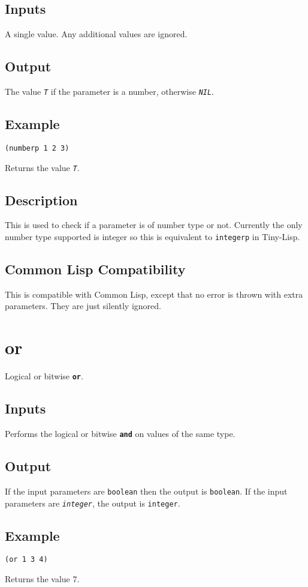 \documentclass[10pt, openany]{book}
\newcommand{\operation}[1]{\textbf{\texttt{#1}}}
\newcommand{\constant}[1]{\emph{\texttt{#1}}}
\newcommand{\keyword}[1]{\texttt{#1}}
\newcommand{\datatype}[1]{\texttt{#1}}
\newcommand{\tl}{Tiny-Lisp}
\newcommand{\cl}{Common Lisp}
\begin{document}
\subsection{Inputs}
A single value.  Any additional values are ignored.
\subsection{Output}
The value \constant{T} if the parameter is a number, otherwise \constant{NIL}.
\subsection{Example}
\begin{lstlisting}
(numberp 1 2 3)
\end{lstlisting}
Returns the value \constant{T}.
\subsection{Description}
This is used to check if a parameter is of number type or not.  Currently the only number type supported is integer so this is equivalent to \keyword{integerp} in \tl.
\subsection{Common Lisp Compatibility}
This is compatible with \cl, except that no error is thrown with extra parameters.  They are just silently ignored.

\section{or}
Logical or bitwise \operation{or}.
\subsection{Inputs}
Performs the logical or bitwise \operation{and} on values of the same type.
\subsection{Output}
If the input parameters are \datatype{boolean} then the output is \datatype{boolean}.  If the input parameters are \constant{integer}, the output is \datatype{integer}.
\subsection{Example}
\begin{lstlisting}
(or 1 3 4)
\end{lstlisting}
Returns the value 7.
\end{document}
